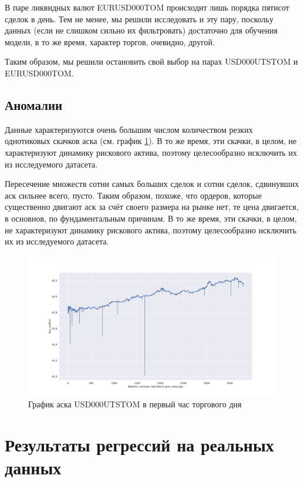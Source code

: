 В паре ликвидных валют EURUSD000TOM происходит лишь порядка пятисот сделок в день. Тем не менее, мы решили исследовать и эту пару,
поскольу данных (если не слишком сильно их фильтровать) достаточно для обучения модели, в то же время, характер торгов, очевидно,
другой. \par
Таким образом, мы решили остановить свой выбор на парах
USD000UTSTOM и EURUSD000TOM.



\subsection{Аномалии}

Данные характеризуются очень большим числом количеством резких однотиковых скачков аска (см. график \ref{askgraph}). 
В то же время, эти скачки, в целом, не характеризуют
динамику рискового актива, поэтому целесообразно исключить их из исследуемого датасета. \par
Пересечение множеств
сотни самых больших сделок и сотни сделок, сдвинувших аск сильнее всего, пусто. Таким образом, похоже, что ордеров,
которые существенно двигают аск за счёт своего размера на рынке нет, те цена двигается, в основнов, по фундаментальным причинам.
В то же время, эти скачки, в целом, не характеризуют
динамику рискового актива, поэтому целесообразно исключить их из исследуемого датасета.
\begin{figure}
    \includegraphics[scale=0.41]{fig/Palki.pdf}
    \caption{График аска USD000UTSTOM в первый час торгового дня}
    \label{askgraph}
\end{figure}


\section{Результаты регрессий на реальных данных}

